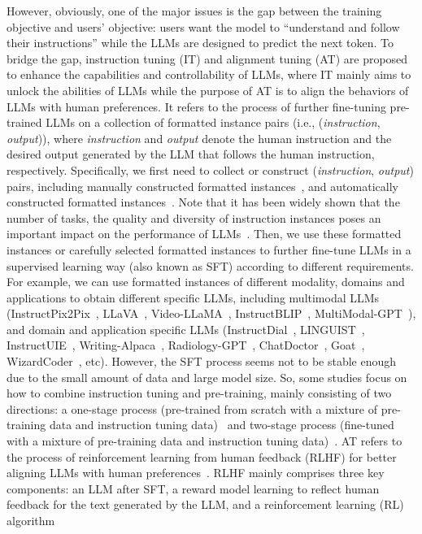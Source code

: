 \documentclass{article}
\begin{document}
However, obviously, one of the major issues is the gap between the training objective and users' objective: users want the model to ``understand and follow their instructions'' while the LLMs are designed to predict the next token. To bridge the gap, instruction tuning (IT) and alignment tuning (AT) are proposed to enhance the capabilities and controllability of LLMs, where IT mainly aims to unlock the abilities of LLMs while the purpose of AT is to align the behaviors of LLMs with human preferences. It refers to the process of further fine-tuning pre-trained LLMs on a collection of formatted instance pairs (i.e., (\textit{instruction}, \textit{output})), where \textit{instruction} and \textit{output} denote the human instruction and the desired output generated by the LLM that follows the human instruction, respectively. Specifically, we first need to collect or construct (\textit{instruction}, \textit{output}) pairs, including manually constructed formatted instances~\cite{mishra2021cross,victor2022multitask,muennighoff2022crosslingual,wang2022super,longpre2023flan,zhou2023lima,conover2023free,kopf2023openassistant}, and automatically constructed formatted instances~\cite{wei2021finetuned,bach2022promptsource,honovich2022unnatural,wang2022self,xu2023wizardlm,xu2023baize,ji2023towards}. Note that it has been widely shown that the number of tasks, the quality and diversity of instruction instances poses an important impact on the performance of LLMs~\cite{ouyang2022training,victor2022multitask,wei2021finetuned,wang2022super,chung2022scaling,taori2023stanford,zhou2023lima}. Then, we use these formatted instances or carefully selected formatted instances to further fine-tune LLMs in a supervised learning way (also known as SFT) according to different requirements. For example, we can use formatted instances of different modality, domains and applications to obtain different specific LLMs, including multimodal LLMs (InstructPix2Pix~\cite{brooks2023instructpix2pix}, LLaVA~\cite{liu2023visual}, Video-LLaMA~\cite{zhang2023video}, InstructBLIP~\cite{dai2023instructblip}, MultiModal-GPT~\cite{gong2023multimodal}), and domain and application specific LLMs (InstructDial~\cite{gupta2022instructdial}, LINGUIST~\cite{rosenbaum2022linguist}, InstructUIE~\cite{wang2023instructuie}, Writing-Alpaca~\cite{zhang2023multi}, Radiology-GPT~\cite{liu2023radiology}, ChatDoctor~\cite{yunxiang2023chatdoctor}, Goat~\cite{liu2023goat}, WizardCoder~\cite{luo2023wizardcoder}, etc). However, the SFT process seems not to be stable enough due to the small amount of data and large model size. So, some studies focus on how to combine instruction tuning and pre-training, mainly consisting of two directions: a one-stage process (pre-trained from scratch with a mixture of pre-training data and instruction tuning data)~\cite{raffel2020exploring,zeng2022glm} and two-stage process (fine-tuned with a mixture of pre-training data and instruction tuning data)~\cite{iyer2022opt}. AT refers to the process of reinforcement learning from human feedback (RLHF) for better aligning LLMs with human preferences~\cite{ouyang2022training}. RLHF mainly comprises three key components: an LLM after SFT, a reward model learning to reflect human feedback for the text generated by the LLM, and a reinforcement learning (RL) algorithm 
\end{document}
